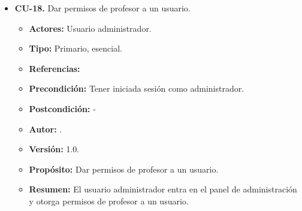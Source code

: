 \begin{itemize}
\newpage


  \item \textbf{CU-18.} Dar permisos de profesor a un usuario.
  \begin{itemize}
    \item \textbf{Actores:} Usuario administrador.
    \item \textbf{Tipo:} Primario, esencial.
    \item \textbf{Referencias:}
    \item \textbf{Precondición:} Tener iniciada sesión como administrador.
    \item \textbf{Postcondición:} - 
    \item \textbf{Autor:} \autor.
    \item \textbf{Versión:} 1.0.
    \item \textbf{Propósito:} Dar permisos de profesor a un usuario.
    \item \textbf{Resumen:} El usuario administrador entra en el panel de administración y otorga permisos de profesor a un usuario.


\end{itemize}
\end{itemize}
